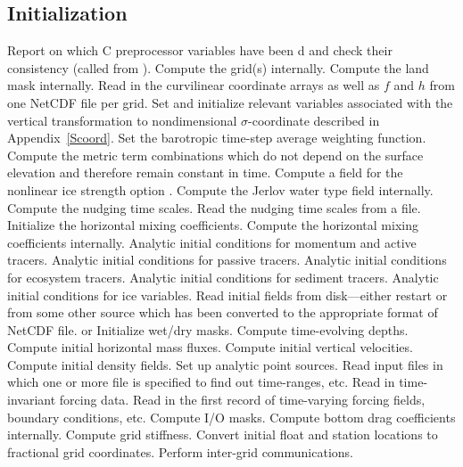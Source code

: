 \subsection{Initialization}
\label{Ini}
   \begin{klist}
     Report on which C preprocessor variables
   have been d and check their consistency (called from
   ).
      Compute the grid(s) internally.
      Compute the land mask internally.
      Read in the curvilinear coordinate arrays as
   well as $f$ and $h$ from one NetCDF file per grid.
       Set and initialize relevant variables
   associated with the vertical transformation to nondimensional
   $\sigma$-coordinate described in Appendix~\ref{Scoord}.
      Set the barotropic time-step average
   weighting function.
        Compute the metric term combinations which do
   not depend on the surface elevation and therefore remain constant in
   time.
      Compute a field for the nonlinear ice
       strength option \citep{Overland_1988}.
      Compute the Jerlov water type field internally.
      Compute the nudging time scales.
      Read the nudging time scales from a file.
      Initialize the horizontal mixing coefficients.
      Compute the horizontal mixing coefficients
     internally.
      Analytic initial conditions for momentum and
       active tracers.
      Analytic initial conditions for passive tracers.
      Analytic initial conditions for ecosystem tracers.
      Analytic initial conditions for sediment tracers.
      Analytic initial conditions for ice variables.
      Read initial fields from disk---either
   restart or from some other source which has been converted to the
   appropriate format of NetCDF file.
       or  Initialize wet/dry masks.
       Compute time-evolving depths.
       Compute initial horizontal mass fluxes.
       Compute initial vertical velocities.
       Compute initial density fields.
       Set up analytic point sources.
      Read input files in which one or more file
  is specified to find out time-ranges, etc.
      Read in time-invariant forcing data.
      Read in the first record of time-varying forcing
  fields, boundary conditions, etc.
      Compute I/O masks.
      Compute bottom drag coefficients internally.
      Compute grid stiffness.
       Convert initial float and station locations to
     fractional grid coordinates.
      Perform inter-grid communications.
   \end{klist}

